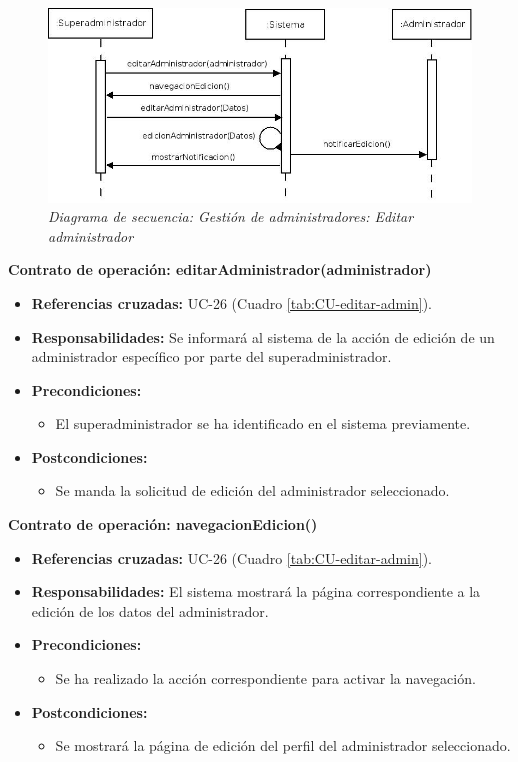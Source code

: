\begin{figure}[H]
\centering
  \includegraphics[scale=.50]{img/secuencias/gestion-administradores-editar-administrador.jpeg}
  \caption{\textit{Diagrama de secuencia: Gestión de administradores: Editar administrador}}
  \label{fig:secuencia-gestion-administradores-editar-administrador}
\end{figure}

\textbf{Contrato de operación: editarAdministrador(administrador)}
\begin{itemize}
\item \textbf{Referencias cruzadas:} UC-26 (Cuadro \ref{tab:CU-editar-admin}).
\item \textbf{Responsabilidades:} Se informará al sistema de la acción de edición de un administrador específico por parte del superadministrador.
\item \textbf{Precondiciones:} 
 \begin{itemize}
\item El superadministrador se ha identificado en el sistema previamente.
\end {itemize}
\item \textbf{Postcondiciones:} 
 \begin{itemize}
\item Se manda la solicitud de edición del administrador seleccionado.
\end {itemize}
\end {itemize}

\textbf{Contrato de operación: navegacionEdicion()}
\begin{itemize}
\item \textbf{Referencias cruzadas:} UC-26 (Cuadro \ref{tab:CU-editar-admin}).
\item \textbf{Responsabilidades:} El sistema mostrará la página correspondiente a la edición de los datos del administrador.
\item \textbf{Precondiciones:} 
 \begin{itemize}
\item Se ha realizado la acción correspondiente para activar la navegación.
\end {itemize}
\item \textbf{Postcondiciones:} 
 \begin{itemize}
\item Se mostrará la página de edición del perfil del administrador seleccionado.
\end {itemize}
\end {itemize}

